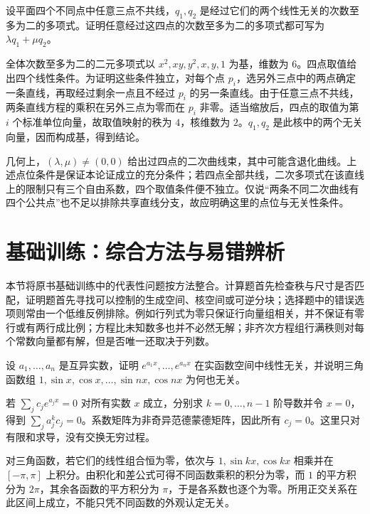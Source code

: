 \begin{example}
\label{ex:laex-conic-pencil}
设平面四个不同点中任意三点不共线，$q_1,q_2$ 是经过它们的两个线性无关的次数至多为二的多项式。证明任意经过这四点的次数至多为二的多项式都可写为 $\lambda q_1+\mu q_2$。
\end{example}

\begin{solve}
全体次数至多为二的二元多项式以 $x^2,xy,y^2,x,y,1$ 为基，维数为 $6$。四点取值给出四个线性条件。为证明这些条件独立，对每个点 $p_i$，选另外三点中的两点确定一条直线，再取经过剩余一点且不经过 $p_i$ 的另一条直线。由于任意三点不共线，两条直线方程的乘积在另外三点为零而在 $p_i$ 非零。适当缩放后，四点的取值为第 $i$ 个标准单位向量，故取值映射的秩为 $4$，核维数为 $2$。$q_1,q_2$ 是此核中的两个无关向量，因而构成基，得到结论。

几何上，$(\lambda,\mu)\ne(0,0)$ 给出过四点的二次曲线束，其中可能含退化曲线。上述点位条件是保证本论证成立的充分条件；若四点全部共线，二次多项式在该直线上的限制只有三个自由系数，四个取值条件便不独立。仅说“两条不同二次曲线有四个公共点”也不足以排除共享直线分支，故应明确这里的点位与无关性条件。
\end{solve}

\section{基础训练：综合方法与易错辨析}
\label{sec:laex-training}

本节将原书基础训练中的代表性问题按方法整合。计算题首先检查秩与尺寸是否匹配，证明题首先寻找可以控制的生成空间、核空间或可逆分块；选择题中的错误选项则常由一个低维反例排除。例如行列式为零只保证行向量组相关，并不保证有零行或有两行成比例；方程比未知数多也并不必然无解；非齐次方程组行满秩则对每个常数向量都有解，但是否唯一还取决于列数。

\begin{example}
\label{ex:laex-independent-functions}
设 $a_1,\ldots,a_n$ 是互异实数，证明 $e^{a_1x},\ldots,e^{a_nx}$ 在实函数空间中线性无关，并说明三角函数组 $1,\sin x,\cos x,\ldots,\sin nx,\cos nx$ 为何也无关。
\end{example}

\begin{solve}
若 $\sum_j c_je^{a_jx}=0$ 对所有实数 $x$ 成立，分别求 $k=0,\ldots,n-1$ 阶导数并令 $x=0$，得到 $\sum_j a_j^kc_j=0$。系数矩阵为非奇异范德蒙德矩阵，因此所有 $c_j=0$。这里只对有限和求导，没有交换无穷过程。

对三角函数，若它们的线性组合恒为零，依次与 $1,\sin kx,\cos kx$ 相乘并在 $[-\pi,\pi]$ 上积分。由积化和差公式可得不同函数乘积的积分为零，而 $1$ 的平方积分为 $2\pi$，其余各函数的平方积分为 $\pi$，于是各系数也逐个为零。所用正交关系在此区间上成立，不能只凭不同函数的外观认定无关。
\end{solve}

